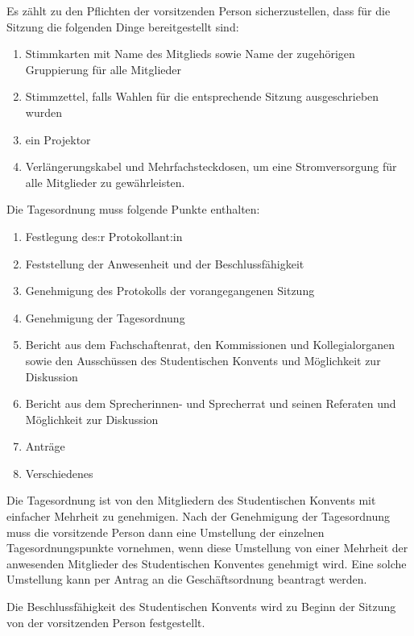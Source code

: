 \documentclass[10pt,a4paper]{scrartcl}
\providecommand{\tightlist}{%
\setlength{\itemsep}{0pt}\setlength{\parskip}{0pt}}
\begin{document}
\begin{contract}
  Es zählt zu den Pflichten der vorsitzenden Person sicherzustellen,
  dass für die Sitzung die folgenden Dinge bereitgestellt sind:

\begin{enumerate}
\item
  Stimmkarten mit Name des Mitglieds sowie Name der zugehörigen
  Gruppierung für alle Mitglieder
\item
  Stimmzettel, falls Wahlen für die entsprechende Sitzung ausgeschrieben
  wurden
\item
  ein Projektor
\item
  Verlängerungskabel und Mehrfachsteckdosen, um eine Stromversorgung für
  alle Mitglieder zu gewährleisten.
\end{enumerate}


\label{tagesordnung}

  Die Tagesordnung muss folgende Punkte enthalten:
\begin{enumerate}[label=\alph*]
	\tightlist
\item Festlegung des:r
  Protokollant:in
\item Feststellung der Anwesenheit und der
  Beschlussfähigkeit
\item Genehmigung des Protokolls der vorangegangenen
  Sitzung
\item Genehmigung der Tagesordnung
\item Bericht aus dem
  Fachschaftenrat, den Kommissionen und Kollegialorganen sowie den
  Ausschüssen des Studentischen Konvents und Möglichkeit zur Diskussion
\item Bericht aus dem Sprecherinnen- und Sprecherrat und seinen Referaten
  und Möglichkeit zur Diskussion
\item Anträge
\item Verschiedenes
	\end{enumerate}

  Die Tagesordnung ist von den Mitgliedern des Studentischen Konvents
  mit einfacher Mehrheit zu genehmigen. Nach der Genehmigung der
  Tagesordnung muss die vorsitzende Person dann eine Umstellung der
  einzelnen Tagesordnungspunkte vornehmen, wenn diese Umstellung von
  einer Mehrheit der anwesenden Mitglieder des Studentischen Konventes
  genehmigt wird. Eine solche Umstellung kann per Antrag an die
  Geschäftsordnung beantragt werden.


\label{beschlussfuxe4higkeit}



  Die Beschlussfähigkeit des Studentischen Konvents wird zu Beginn der
  Sitzung von der vorsitzenden Person festgestellt.


\end{contract}
\end{document}

